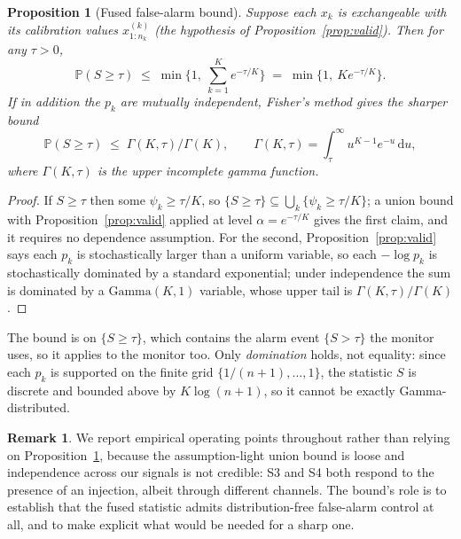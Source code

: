 \documentclass[preprint,12pt,authoryear]{elsarticle}
\newtheorem{proposition}[theorem]{Proposition}
\theoremstyle{definition}
\newtheorem{remark}{Remark}
\newcommand{\Prob}{\mathbb{P}}
\begin{document}
\begin{proposition}[Fused false-alarm bound]\label{prop:fusebound}
Suppose each $x_k$ is exchangeable with its calibration values
$x^{(k)}_{1:n_k}$ (the hypothesis of Proposition~\ref{prop:valid}). Then for any
$\tau > 0$,
\begin{equation}
\Prob(S \ge \tau) \;\le\; \min\Big\{1,\ \sum_{k=1}^{K} e^{-\tau/K} \Big\}
\;=\; \min\{1,\ K e^{-\tau/K}\}.
\end{equation}
If in addition the $p_k$ are mutually independent, Fisher's method gives the
sharper bound
\begin{equation}\label{eq:fisherbound}
\Prob(S \ge \tau) \;\le\; \Gamma(K,\tau)/\Gamma(K),
\qquad
\Gamma(K,\tau) = \int_\tau^\infty u^{K-1}e^{-u}\,\mathrm{d}u ,
\end{equation}
where $\Gamma(K,\tau)$ is the upper incomplete gamma function.
\end{proposition}

\begin{proof}
If $S \ge \tau$ then some $\psi_k \ge \tau/K$, so
$\{S \ge \tau\} \subseteq \bigcup_k \{\psi_k \ge \tau/K\}$; a union bound with
Proposition~\ref{prop:valid} applied at level $\alpha = e^{-\tau/K}$ gives the
first claim, and it requires no dependence assumption. For the second,
Proposition~\ref{prop:valid} says each $p_k$ is stochastically larger than a
uniform variable, so each $-\log p_k$ is stochastically dominated by a standard
exponential; under independence the sum is dominated by a $\mathrm{Gamma}(K,1)$
variable, whose upper tail is $\Gamma(K,\tau)/\Gamma(K)$.
\end{proof}

The bound is on $\{S \ge \tau\}$, which contains the alarm event $\{S > \tau\}$ the
monitor uses, so it applies to the monitor too.
Only \emph{domination} holds, not equality: since each $p_k$ is supported on the
finite grid $\{1/(n{+}1),\dots,1\}$, the statistic $S$ is discrete and bounded
above by $K\log(n{+}1)$, so it cannot be exactly Gamma-distributed.

\begin{remark}
We report empirical operating points throughout rather than relying on
Proposition~\ref{prop:fusebound}, because the assumption-light union bound is
loose and independence across our signals is not credible: S3 and S4 both respond
to the presence of an injection, albeit through different channels. The bound's
role is to establish that the fused statistic admits distribution-free
false-alarm control at all, and to make explicit what would be needed for a sharp
one.
\end{remark}
\end{document}
